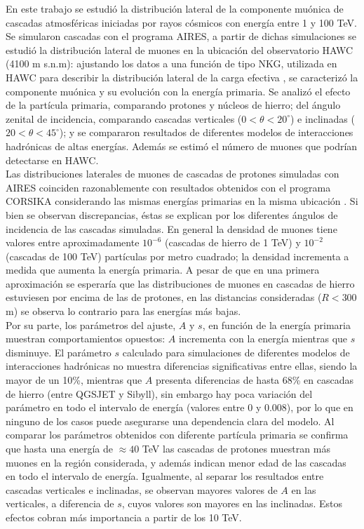 En este trabajo se estudi\'o la distribuci\'on lateral de la componente mu\'onica de cascadas atmosf\'ericas iniciadas por rayos c\'osmicos con energ\'ia entre 1 y 100 TeV. Se simularon cascadas con el programa AIRES, a partir de dichas simulaciones se estudi\'o la distribuci\'on lateral de muones en la ubicaci\'on del observatorio HAWC (4100 m s.n.m): ajustando los datos a una funci\'on de tipo NKG, utilizada en HAWC para describir la distribuci\'on lateral de la carga efectiva \cite{Malone2018}, se caracteriz\'o la componente mu\'onica y su evoluci\'on con la energ\'ia primaria. Se analiz\'o el efecto de la part\'icula primaria, comparando protones y n\'ucleos de hierro; del \'angulo zenital de incidencia, comparando cascadas verticales ($0<\theta<20^{\circ}$) e inclinadas ($20<\theta<45^{\circ}$); y se compararon resultados de diferentes modelos de interacciones hadr\'onicas de altas energ\'ias. Adem\'as se estim\'o el n\'umero de muones que podr\'ian detectarse en HAWC.\\

Las distribuciones laterales de muones de cascadas de protones simuladas con AIRES coinciden razonablemente con resultados obtenidos con el programa CORSIKA considerando las mismas energ\'ias primarias en la misma ubicaci\'on \cite{Parsons2019}. Si bien se observan discrepancias, \'estas se explican por los diferentes \'angulos de incidencia de las cascadas simuladas. En general la densidad de muones tiene valores entre aproximadamente $10^{-6}$ (cascadas de hierro de 1 TeV) y $10^{-2}$ (cascadas de 100 TeV) part\'iculas por metro cuadrado; la densidad incrementa a medida que aumenta la energ\'ia primaria. A pesar de que en una primera aproximaci\'on se esperar\'ia que las distribuciones de muones en cascadas de hierro estuviesen por encima de las de protones, en las distancias consideradas ($R<300$ m) se observa lo contrario para las energ\'ias m\'as bajas. \\

Por su parte, los par\'ametros del ajuste, $A$ y $s$, en funci\'on de la energ\'ia primaria muestran comportamientos opuestos: $A$ incrementa con la energ\'ia mientras que $s$ disminuye. El par\'ametro $s$ calculado para simulaciones de diferentes modelos de interacciones hadr\'onicas no muestra diferencias significativas entre ellas, siendo la mayor de un 10\%, mientras que $A$ presenta diferencias de hasta 68\% en cascadas de hierro (entre QGSJET y Sibyll), sin embargo hay poca variaci\'on del par\'ametro en todo el intervalo de energ\'ia (valores entre 0 y 0.008), por lo que en ninguno de los casos puede asegurarse una dependencia clara del modelo. Al comparar los par\'ametros obtenidos con diferente part\'icula primaria se confirma que hasta una energ\'ia de $\approx 40$ TeV las cascadas de protones muestran m\'as muones en la regi\'on considerada, y adem\'as indican menor edad de las cascadas en todo el intervalo de energ\'ia. Igualmente, al separar los resultados entre cascadas verticales e inclinadas, se observan mayores valores de $A$ en las verticales, a diferencia de $s$, cuyos valores son mayores en las inclinadas. Estos efectos cobran m\'as importancia a partir de los 10 TeV. \\

